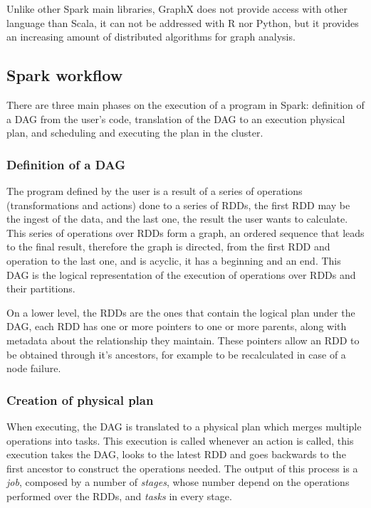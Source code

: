 \documentclass[11pt]{book} %
\begin{document}
          Unlike other Spark main libraries, GraphX does not provide access with other language than Scala, it can not be addressed with R nor Python, but it provides an increasing amount of distributed algorithms for graph analysis.

      \subsection{Spark workflow}

        There are three main phases on the execution of a program in Spark: definition of a DAG from the user's code, translation of the DAG to an execution physical plan, and scheduling and executing the plan in the cluster.

        \subsubsection{Definition of a DAG}

          The program defined by the user is a result of a series of operations (transformations and actions) done to a series of RDDs, the first RDD may be the ingest of the data, and the last one, the result the user wants to calculate. This series of operations over RDDs form a graph, an ordered sequence that leads to the final result, therefore the graph is directed, from the first RDD and operation to the last one, and is acyclic, it has a beginning and an end. This DAG is the logical representation of the execution of operations over RDDs and their partitions.

          On a lower level, the RDDs are the ones that contain the logical plan under the DAG, each RDD has one or more pointers to one or more parents, along with metadata about the relationship they maintain. These pointers allow an RDD to be obtained through it's ancestors, for example to be recalculated in case of a node failure.

        \subsubsection{Creation of physical plan}

          When executing, the DAG is translated to a physical plan which merges multiple operations into tasks. This execution is called whenever an action is called, this execution takes the DAG, looks to the latest RDD and goes backwards to the first ancestor to construct the operations needed. The output of this process is a \emph{job}, composed by a number of \emph{stages}, whose number depend on the operations performed over the RDDs, and \emph{tasks} in every stage.
\end{document}

